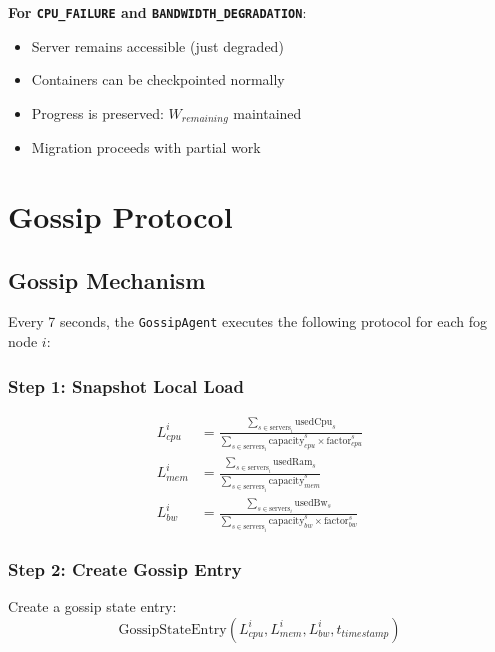 \documentclass[12pt,a4paper]{article}
\begin{document}
\textbf{For \texttt{CPU\_FAILURE} and \texttt{BANDWIDTH\_DEGRADATION}}:
\begin{itemize}
    \item Server remains accessible (just degraded)
    \item Containers can be checkpointed normally
    \item Progress is preserved: $W_{remaining}$ maintained
    \item Migration proceeds with partial work
\end{itemize}

\section{Gossip Protocol}

\subsection{Gossip Mechanism}

Every 7 seconds, the \texttt{GossipAgent} executes the following protocol for each fog node $i$:

\subsubsection{Step 1: Snapshot Local Load}

\begin{align}
    L_{cpu}^i &= \frac{\sum_{s \in \text{servers}_i} \text{usedCpu}_s}{\sum_{s \in \text{servers}_i} \text{capacity}_{cpu}^s \times \text{factor}_{cpu}^s} \\
    L_{mem}^i &= \frac{\sum_{s \in \text{servers}_i} \text{usedRam}_s}{\sum_{s \in \text{servers}_i} \text{capacity}_{mem}^s} \\
    L_{bw}^i &= \frac{\sum_{s \in \text{servers}_i} \text{usedBw}_s}{\sum_{s \in \text{servers}_i} \text{capacity}_{bw}^s \times \text{factor}_{bw}^s}
\end{align}

\subsubsection{Step 2: Create Gossip Entry}

Create a gossip state entry:
\begin{equation}
    \text{GossipStateEntry}(L_{cpu}^i, L_{mem}^i, L_{bw}^i, t_{timestamp})
\end{equation}
\end{document}
